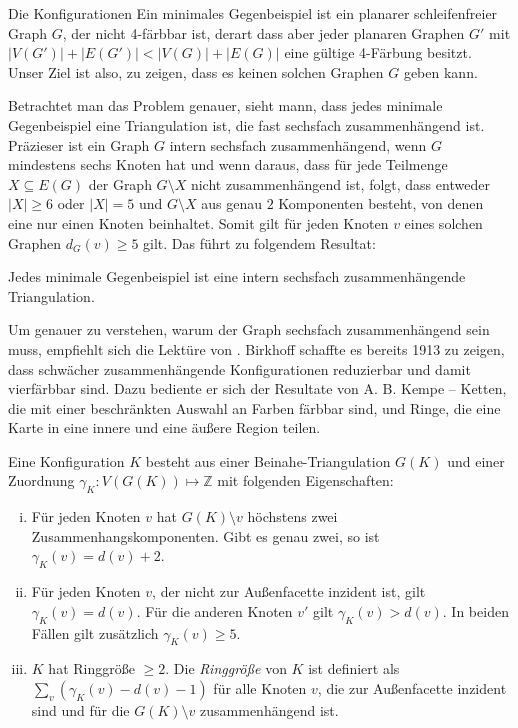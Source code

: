   \begin{section}{Die Konfigurationen}
   Ein minimales Gegenbeispiel ist ein planarer schleifenfreier Graph $G$, der nicht 4-färbbar ist, derart dass aber jeder planaren Graphen $G'$ mit $|V(G')| + |E(G')| < |V(G)| + |E(G)|$ eine gültige 4-Färbung besitzt. Unser Ziel ist also, zu zeigen, dass es keinen solchen Graphen $G$ geben kann. 
   
   Betrachtet man das Problem genauer, sieht mann, dass jedes minimale Gegenbeispiel eine Triangulation ist, die fast sechsfach zusammenhängend ist. Präzieser ist ein Graph $G$ intern sechsfach zusammenhängend, wenn $G$ mindestens sechs Knoten hat und wenn daraus, dass für jede Teilmenge $X \subseteq E(G)$ der Graph $G\setminus X$ nicht zusammenhängend ist, folgt, dass entweder $|X| \geq 6$ oder $|X| = 5$ und $G\setminus X$ aus genau $2$ Komponenten besteht, von denen eine nur einen Knoten beinhaltet. Somit gilt für jeden Knoten $v$ eines solchen Graphen $d_G(v) \geq 5$ gilt. Das führt zu folgendem Resultat:
  
  \begin{satz}\label{4.1}
   Jedes minimale Gegenbeispiel ist eine intern sechsfach zusammenhängende Triangulation. 
  \end{satz}

  Um genauer zu verstehen, warum der Graph sechsfach zusammenhängend sein muss, empfiehlt sich die Lektüre von \cite{AmJMath35}. Birkhoff schaffte es bereits 1913 zu zeigen, dass schwächer zusammenhängende Konfigurationen reduzierbar und damit vierfärbbar sind. Dazu bediente er sich der Resultate von A. B. Kempe -- Ketten, die mit einer beschränkten Auswahl an Farben färbbar sind, und Ringe, die eine Karte in eine innere und eine äußere Region teilen. 
  
  \begin{definition}[Konfiguration]
   Eine Konfiguration $K$ besteht aus einer Beinahe-Triangulation $G(K)$ und einer Zuordnung $\gamma_K : V(G(K)) \mapsto \mathbb{Z}$ mit folgenden Eigenschaften:
   \begin{enumerate}[i)]
    \item Für jeden Knoten $v$ hat $G(K) \setminus v$ höchstens zwei Zusammenhangskomponenten. Gibt es genau zwei, so ist $\gamma_K(v) = d(v) + 2$.
    \item Für jeden Knoten $v$, der nicht zur Außenfacette inzident ist, gilt $\gamma_K(v) = d(v)$. Für die anderen Knoten $v'$ gilt $\gamma_K(v) > d(v)$. In beiden Fällen gilt zusätzlich $\gamma_K(v) \geq 5$.
    \item $K$ hat Ringgröße $\geq 2$. Die \textit{Ringgröße} von $K$ ist definiert als $\sum_v (\gamma_K(v) - d(v) - 1)$ für alle Knoten $v$, die zur Außenfacette inzident sind und für die $G(K) \setminus v$ zusammenhängend ist.
   \end{enumerate}
  \end{definition}
   

\end{section}
